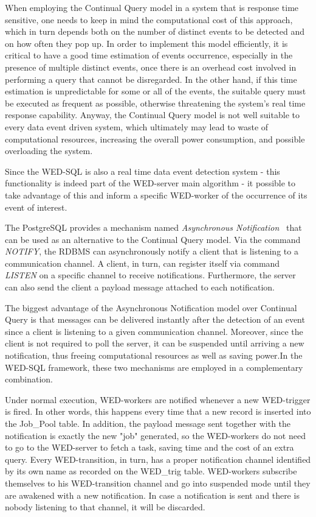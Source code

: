 \documentclass[12pt]{article}
\begin{document}
When employing the Continual Query model in a system that is response time sensitive, one needs to keep in mind the computational cost of this approach, which in turn depends both on the number of distinct events to be detected and on how 
often they pop up. In order to implement this model efficiently, it is critical to have a good time estimation of events occurrence, especially in the presence of multiple distinct events, once there is an overhead cost involved in performing a query that cannot be disregarded. In the other hand, if this time estimation is unpredictable for some or all of the events, the suitable query must be executed as frequent as possible, otherwise threatening the system's real time response capability. Anyway, the Continual Query model is not well suitable to every data event driven system, which ultimately may lead to waste of computational resources, increasing the overall power consumption, and possible overloading the system.     
  
Since the WED-SQL is also a real time data event detection system - this functionality is indeed part of the WED-server main algorithm - it possible to take advantage of this and inform a specific WED-worker of the occurrence of its event of interest.     

The PostgreSQL provides a mechanism named  \emph{Asynchronous Notification}~\cite{AN} that can be used as an alternative to the Continual Query model. Via the command \emph{NOTIFY}, the RDBMS can asynchronously notify a client that  is listening to a communication channel. A client, in turn, can register itself via command \emph{LISTEN} on a specific  channel to receive notifications. Furthermore, the server can also send the client a payload message attached to each notification. 

The biggest advantage of the Asynchronous Notification model over Continual Query is that messages can be delivered instantly after the detection of an event since a client is  listening to a given communication channel. Moreover, since the client is not required to poll the server, it can be suspended until arriving a new notification, thus freeing computational resources as well as saving power.In the WED-SQL framework, these two mechanisms are employed in a complementary combination. 

 Under normal execution, WED-workers are notified whenever a new WED-trigger is fired. In other words, this happens  every time that a new record is inserted into the Job\_Pool table. In addition, the payload message sent together with the notification is exactly the new "job" generated, so the WED-workers do not need to go to the WED-server to fetch a task, saving time and the cost of an extra query. Every WED-transition, in turn, has a proper notification channel identified by its own name as recorded on the WED\_trig table. WED-workers subscribe themselves to his WED-transition channel and  go into suspended mode until they are awakened with a new notification. In case a notification is sent and there is nobody listening to that channel, it will be discarded.  
\end{document}
